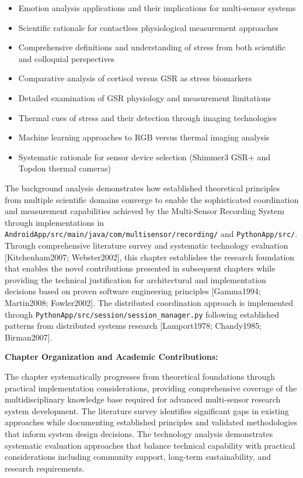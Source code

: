 \documentclass[12pt,a4paper]{article}
\begin{document}
\begin{itemize}
\item Emotion analysis applications and their implications for multi-sensor systems
\item Scientific rationale for contactless physiological measurement approaches
\item Comprehensive definitions and understanding of stress from both scientific and colloquial perspectives
\item Comparative analysis of cortisol versus GSR as stress biomarkers
\item Detailed examination of GSR physiology and measurement limitations
\item Thermal cues of stress and their detection through imaging technologies
\item Machine learning approaches to RGB versus thermal imaging analysis
\item Systematic rationale for sensor device selection (Shimmer3 GSR+ and Topdon thermal cameras)

\end{itemize}
The background analysis demonstrates how established theoretical principles from multiple scientific domains converge to
enable the sophisticated coordination and measurement capabilities achieved by the Multi-Sensor Recording System through
implementations in \texttt{AndroidApp/src/main/java/com/multisensor/recording/} and \texttt{PythonApp/src/}. Through comprehensive
literature survey and systematic technology evaluation [Kitchenham2007; Webster2002], this chapter establishes the
research foundation that enables the novel contributions presented in subsequent chapters while providing the technical
justification for architectural and implementation decisions based on proven software engineering
principles [Gamma1994; Martin2008; Fowler2002]. The distributed coordination approach is implemented through
\texttt{PythonApp/src/session/session\_manager.py} following established patterns from distributed systems
research [Lamport1978; Chandy1985; Birman2007].

\textbf{Chapter Organization and Academic Contributions:}

The chapter systematically progresses from theoretical foundations through practical implementation considerations,
providing comprehensive coverage of the multidisciplinary knowledge base required for advanced multi-sensor research
system development. The literature survey identifies significant gaps in existing approaches while documenting
established principles and validated methodologies that inform system design decisions. The technology analysis
demonstrates systematic evaluation approaches that balance technical capability with practical considerations including
community support, long-term sustainability, and research requirements.
\end{document}
